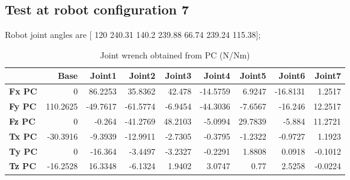 
\subsection{Test at robot configuration 7}
Robot joint angles are  [ 120        240.31         140.2        239.88         66.74        239.24        115.38];

\begin{table}[h!]
	\centering
	\caption{Joint wrench obtained from PC (N/Nm)}
	\label{wrech_PC_Pose7}
	\begin{tabular}{|l|r|r|r|r|r|r|r|r|}
		\hline
		\textbf{}  & \textbf{Base} & \textbf{Joint1}  & \textbf{Joint2}  & \textbf{Joint3}  & \textbf{Joint4}  & \textbf{Joint5}  & \textbf{Joint6}  & \textbf{Joint7} \\ \hline
		\textbf{Fx PC}  & 0        & 86.2253        & 35.8362        & 42.478        & -14.5759        & 6.9247        & -16.8131        & 1.2517 \\ \hline
		\textbf{Fy PC}  & 110.2625        & -49.7617        & -61.5774        & -6.9454        & -44.3036        & -7.6567        & -16.246        & 12.2517 \\ \hline
		\textbf{Fz PC}  & 0        & -0.264        & -41.2769        & 48.2103        & -5.0994        & 29.7839        & -5.884        & 11.2721 \\ \hline
		\textbf{Tx PC}  & -30.3916        & -9.3939        & -12.9911        & -2.7305        & -0.3795        & -1.2322        & -0.9727        & 1.1923 \\ \hline
		\textbf{Ty PC}  & 0        & -16.364        & -3.4497        & -3.2327        & -0.2291        & 1.8808        & 0.0918        & -0.1012 \\ \hline
		\textbf{Tz PC}  & -16.2528        & 16.3348        & -6.1324        & 1.9402        & 3.0747        & 0.77        & 2.5258        & -0.0224 \\ \hline
	\end{tabular}
\end{table}


